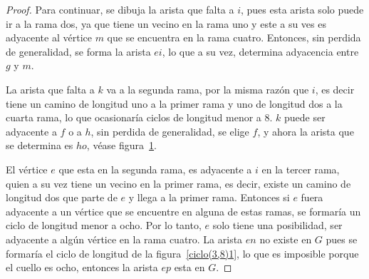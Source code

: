 \documentclass[12pt]{book}
\theoremstyle{definition}
\begin{document}
\begin{proof}
Para continuar, se dibuja la arista que falta
a $i$, pues esta arista solo puede ir a la rama dos, ya que tiene un
vecino en la rama uno y este a su ves es adyacente al vértice $m$ que
se encuentra en la rama cuatro. Entonces, sin perdida de generalidad,
se forma la arista $ei$, lo que a su vez, determina adyacencia entre
$g$ y $m$. 

La arista que falta a $k$ va a la segunda rama, por la
misma razón que $i$, es decir tiene un camino de longitud uno a la
primer rama y uno de longitud dos a la cuarta rama, lo que ocasionaría
ciclos de longitud menor a 8. $k$ puede ser adyacente a $f$ o a $h$,
sin perdida de generalidad, se elige $f$, y ahora la arista que se
determina es $ho$, véase figura~\ref{arbol2(3,8)}.

\begin{figure}
  \centering
  \caption{} \label{arbol2(3,8)}
\end{figure}

El vértice $e$ que esta en la segunda rama, es adyacente a $i$ en
la tercer rama, quien a su vez tiene un vecino en la primer rama, es
decir, existe un camino de longitud dos que parte de $e$ y llega a la
primer rama. Entonces si $e$ fuera adyacente a un vértice que se
encuentre en alguna de estas ramas, se formaría un ciclo de longitud
menor a ocho. Por lo tanto, $e$ solo tiene una posibilidad, ser
adyacente a algún vértice en la rama cuatro. La arista $en$  no existe
en $G$ pues se formaría el ciclo de longitud de la
figura~\ref{ciclo(3,8)1}, lo que es imposible porque el cuello es
ocho,  entonces la arista $ep$ esta en $G$.


\end{proof}
\end{document}
